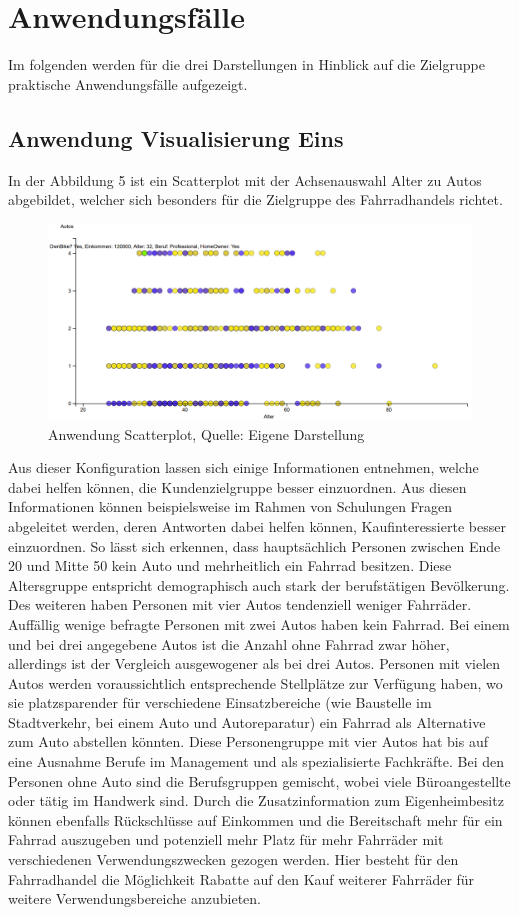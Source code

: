 \documentclass[usegeometry=true]{scrartcl}
\begin{document}
\section{Anwendungsfälle}
Im folgenden werden für die drei Darstellungen in Hinblick auf die Zielgruppe praktische Anwendungsfälle aufgezeigt. 
\subsection{Anwendung Visualisierung Eins}
In der Abbildung 5 ist ein Scatterplot mit der Achsenauswahl Alter zu Autos abgebildet, welcher sich besonders für die Zielgruppe des Fahrradhandels richtet.
\begin{figure}[h]
\begin{center}
\includegraphics[width=16cm]{Bilder/ScatterplotA1.png}
\caption{Anwendung Scatterplot, Quelle: Eigene Darstellung}
\end{center}
\end{figure}
\newline Aus dieser Konfiguration lassen sich einige Informationen entnehmen, welche dabei helfen können, die Kundenzielgruppe besser einzuordnen. Aus diesen Informationen können beispielsweise im Rahmen von Schulungen Fragen abgeleitet werden, deren Antworten dabei helfen können, Kaufinteressierte besser einzuordnen. 
So lässt sich erkennen, dass hauptsächlich Personen zwischen Ende 20 und Mitte 50 kein Auto und mehrheitlich ein Fahrrad besitzen. Diese Altersgruppe entspricht demographisch auch stark der berufstätigen Bevölkerung. Des weiteren haben Personen mit vier Autos tendenziell weniger Fahrräder. Auffällig wenige befragte Personen mit zwei Autos haben kein Fahrrad. Bei einem und bei drei angegebene Autos ist die Anzahl ohne Fahrrad zwar höher, allerdings ist der Vergleich ausgewogener als bei drei Autos. Personen mit vielen Autos werden voraussichtlich entsprechende Stellplätze zur Verfügung haben, wo sie platzsparender für verschiedene Einsatzbereiche (wie Baustelle im Stadtverkehr, bei einem Auto und Autoreparatur) ein Fahrrad als Alternative zum Auto abstellen könnten. 
Diese Personengruppe mit vier Autos hat bis auf eine Ausnahme Berufe im Management und als spezialisierte Fachkräfte. Bei den Personen ohne Auto sind die Berufsgruppen gemischt, wobei viele Büroangestellte oder tätig im Handwerk sind.
Durch die Zusatzinformation zum Eigenheimbesitz können ebenfalls Rückschlüsse auf Einkommen und die Bereitschaft mehr für ein Fahrrad auszugeben und potenziell mehr Platz für mehr Fahrräder mit verschiedenen Verwendungszwecken gezogen werden. Hier besteht für den Fahrradhandel die Möglichkeit Rabatte auf den Kauf weiterer Fahrräder für weitere Verwendungsbereiche anzubieten.
\end{document}
